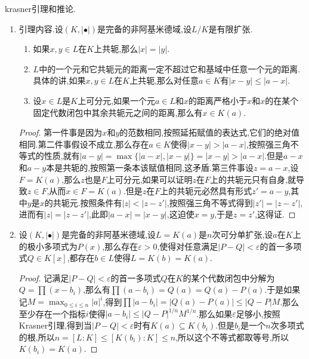 krasner引理和推论.
\begin{enumerate}
	\item 引理内容.设$(K,|\bullet|)$是完备的非阿基米德域,设$L/K$是有限扩张.
	\begin{enumerate}
		\item 如果$x,y\in L$在$K$上共轭,那么$|x|=|y|$.
		\item $L$中的一个元和它共轭元的距离一定不超过它和基域中任意一个元的距离.具体的讲,如果$x,y\in L$在$K$上共轭,那么对任意$a\in K$有$|x-y|\le|a-x|$.
		\item 设$x\in L$是$K$上可分元,如果一个元$a\in L$和$x$的距离严格小于$x$和$x$的在某个固定代数闭包中其余共轭元之间的距离,那么有$x\in K(a)$.
	\end{enumerate}
    \begin{proof}
    	
    	第一件事是因为$x$和$y$的范数相同,按照延拓赋值的表达式,它们的绝对值相同.第二件事假设不成立,那么存在$a\in K$使得$|x-y|>|a-x|$,按照强三角不等式的性质,就有$|a-y|=\max\{|a-x|,|x-y|\}=|x-y|>|a-x|$.但是$a-x$和$a-y$本是共轭的,按照第一条本该赋值相同,这矛盾.第三件事设$z=a-x$,设$F=K(a)$,那么$z$也是$F$上可分元,如果可以证明$z$在$F$上的共轭元只有自身,就导致$z\in F$,从而$x\in F=K(a)$.但是$z$在$F$上的共轭元必然具有形式$z'=a-y$,其中$y$是$x$的共轭元.按照条件有$|z|<|z-z'|$,按照强三角不等式得到$|z'|=|z-z'|$,进而有$|z|=|z-z'|$,此即$|a-x|=|x-y|$,这迫使$x=y$,于是$z=z'$,这得证.
    \end{proof}
    \item 设$(K,|\bullet|)$是完备的非阿基米德域,设$L=K(a)$是$n$次可分单扩张,设$a$在$K$上的极小多项式为$P(x)$,那么存在$\varepsilon>0$,使得对任意满足$|P-Q|<\varepsilon$的首一多项式$Q\in K[x]$,都存在$b\in L$使得$L=K(b)=K(a)$.
    \begin{proof}
    	
    	记满足$|P-Q|<\varepsilon$的首一多项式$Q$在$K$的某个代数闭包中分解为$Q=\prod(x-b_i)$,那么有$\prod(a-b_i)=Q(a)=Q(a)-P(a)$.于是如果记$M=\max_{0\le i\le n}|a|^i$,得到$\prod|a-b_i|=|Q(a)-P(a)|\le|Q-P|M$.那么至少存在一个指标$i$使得$|a-b_i|\le|Q-P|^{1/n}M^{1/n}$.那么如果$\varepsilon$足够小,按照Krasner引理,得到当$|P-Q|<\varepsilon$时有$K(a)\subseteq K(b_i)$.但是$b_i$是一个$n$次多项式的根,所以$n=[L:K]\le[K(b_i):K]\le n$,所以这个不等式都取等号,所以$K(b_i)=K(a)$.
    \end{proof}
\end{enumerate}

